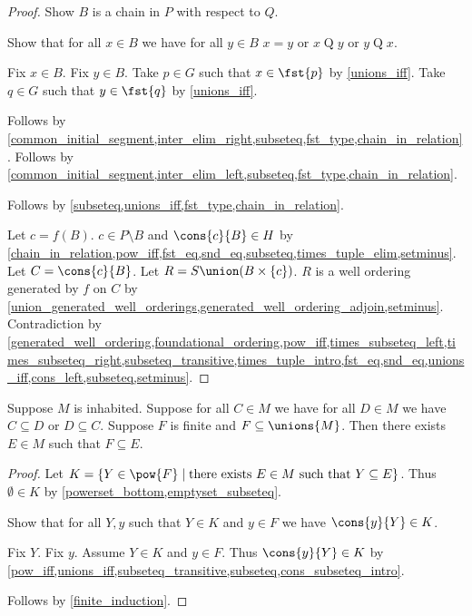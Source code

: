 \begin{proof}
    Show $B$ is a chain in $P$ with respect to $Q$.
    \begin{subproof}
        Show that for all $x\in B$ we have for all $y\in B$
            $x=y$ or $x\mathrel{Q}y$ or $y\mathrel{Q}x$.
        \begin{subproof}
            Fix $x\in B$.
            Fix $y\in B$.
            Take $p\in G$ such that $x\in\fst{p}$ by \cref{unions_iff}.
            Take $q\in G$ such that $y\in\fst{q}$ by \cref{unions_iff}.
            \begin{byCase}
                    Follows by \cref{common_initial_segment,inter_elim_right,subseteq,fst_type,chain_in_relation}.
                    Follows by \cref{common_initial_segment,inter_elim_left,subseteq,fst_type,chain_in_relation}.
            \end{byCase}
        \end{subproof}
        Follows by \cref{subseteq,unions_iff,fst_type,chain_in_relation}.
    \end{subproof}

    Let $c=f(B)$.
    $c\in P\setminus B$ and $\cons{c}{B}\in H$
        by \cref{chain_in_relation,pow_iff,fst_eq,snd_eq,subseteq,times_tuple_elim,setminus}.
    Let $C=\cons{c}{B}$.
    Let $R=S\union(B\times\{c\})$.
    $R$ is a well ordering generated by $f$ on $C$
        by \cref{union_generated_well_orderings,generated_well_ordering_adjoin,setminus}.
    Contradiction
        by \cref{generated_well_ordering,foundational_ordering,pow_iff,times_subseteq_left,times_subseteq_right,subseteq_transitive,times_tuple_intro,fst_eq,snd_eq,unions_iff,cons_left,subseteq,setminus}.
\end{proof}

\begin{lemma}\label{finite_subset_of_chain_union}
    Suppose $M$ is inhabited.
    Suppose for all $C\in M$ we have for all $D\in M$ we have $C\subseteq D$ or $D\subseteq C$.
    Suppose $F$ is finite and $F\subseteq\unions{M}$.
    Then there exists $E\in M$ such that $F\subseteq E$.
\end{lemma}
\begin{proof}
    Let $K=\{Y\in\pow{F}\mid \text{there exists $E\in M$ such that $Y\subseteq E$}\}$.
    Thus $\emptyset\in K$ by \cref{powerset_bottom,emptyset_subseteq}.

    Show that for all $Y,y$ such that $Y\in K$ and $y\in F$ we have $\cons{y}{Y}\in K$.
    \begin{subproof}
        Fix $Y$.
        Fix $y$.
        Assume $Y\in K$ and $y\in F$.
        Thus $\cons{y}{Y}\in K$
            by \cref{pow_iff,unions_iff,subseteq_transitive,subseteq,cons_subseteq_intro}.
    \end{subproof}

    Follows by \cref{finite_induction}.
\end{proof}

